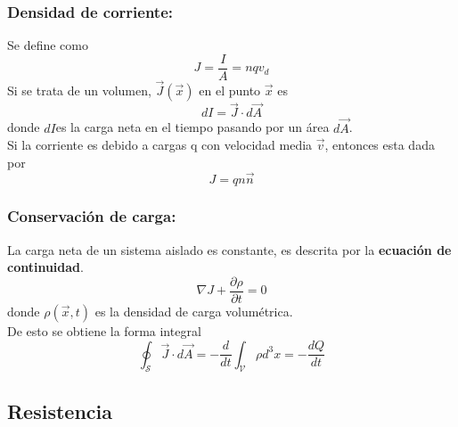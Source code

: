 \documentclass[a4paper, 10pt]{article}
\begin{document}
\begin{multicols*}{2}
	\subsubsection{Densidad de corriente:} Se define como
	$$J=\frac{I}{A}=nqv_d$$
	Si se trata de un volumen, $\vec{J}(\vec{x})$ en el punto $\vec{x}$ es
	$$dI=\vec{J}\cdot d \vec{A}$$
	donde $dI$es la carga neta en el tiempo pasando por un área $d\vec{A}$.\\
	Si la corriente es debido a cargas q con velocidad media $\vec{v}$, entonces esta dada por
	$$J=qn\vec{n}$$
	    
	\subsubsection{Conservación de carga:} La carga neta de un sistema aislado es constante,
  es descrita por la \textbf{ecuación de continuidad}.
	$$\nabla J + \frac{\partial \rho}{\partial t} = 0$$
	donde $\rho(\vec{x},t)$ es la densidad de carga volumétrica.\\
	De esto se obtiene la forma integral $$\oint_{\mathcal{S}}\vec{J}\cdot d\vec{A}=-\frac{d}{dt}\int_{\mathcal{V}}\rho d^3 x=-\frac{dQ}{dt}$$
	    
	\subsection{Resistencia}

\end{multicols*}
\end{document}

